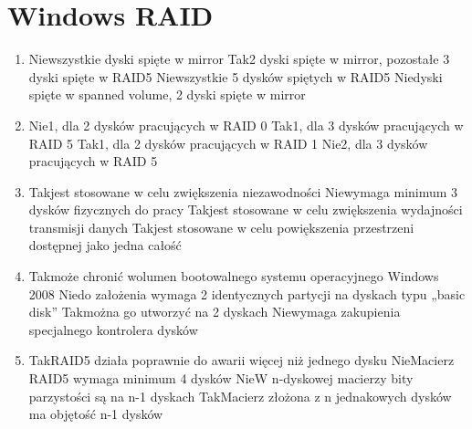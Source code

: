 
\newpage
\section{Windows RAID}
	\begin{enumerate}
		\item {}%
		{Nie}{wszystkie dyski spięte w mirror}%
		{Tak}{2 dyski spięte w mirror, pozostałe 3 dyski spięte w RAID5}%
		{Nie}{wszystkie 5 dysków spiętych w RAID5}%
		{Nie}{dyski spięte w spanned volume, 2 dyski spięte w mirror}
		\item {}%
		{Nie}{1, dla 2 dysków pracujących w RAID 0}%
		{Tak}{1, dla 3 dysków pracujących w RAID 5}%
		{Tak}{1, dla 2 dysków pracujących w RAID 1}%
		{Nie}{2, dla 3 dysków pracujących w RAID 5}
		\item {}%
		{Tak}{jest stosowane w celu zwiększenia niezawodności}%
		{Nie}{wymaga minimum 3 dysków fizycznych do pracy}%
		{Tak}{jest stosowane w celu zwiększenia wydajności transmisji danych}%
		{Tak}{jest stosowane w celu powiększenia przestrzeni dostępnej jako jedna całość}
		\item {}%
		{Tak}{może chronić wolumen bootowalnego systemu operacyjnego Windows 2008}%
		{Nie}{do założenia wymaga 2 identycznych partycji na dyskach typu „basic disk”}%
		{Tak}{można go utworzyć na 2 dyskach}%
		{Nie}{wymaga zakupienia specjalnego kontrolera dysków}
		\item {}%
		{Tak}{RAID5 działa poprawnie do awarii więcej niż jednego dysku}%
		{Nie}{Macierz RAID5 wymaga minimum 4 dysków}%
		{Nie}{W n-dyskowej macierzy bity parzystości są na n-1 dyskach}%
		{Tak}{Macierz złożona z n jednakowych dysków ma objętość n-1 dysków}

\end{enumerate}
